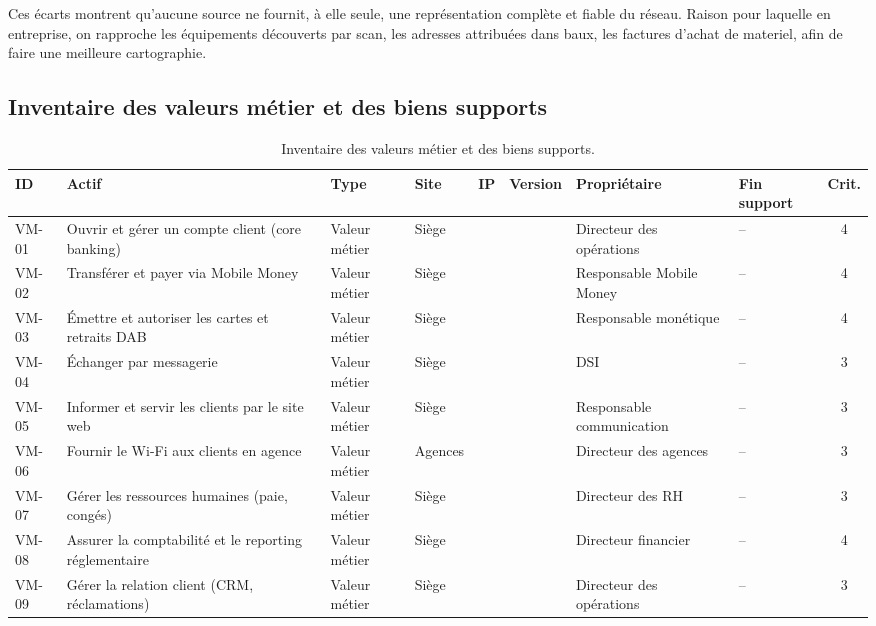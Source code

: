 \documentclass[11pt,a4paper]{article}
\newcommand{\NA}{\textemdash}
\begin{document}
	Ces écarts montrent qu'aucune source ne fournit, à elle seule, une représentation complète et fiable du réseau. Raison pour laquelle en entreprise, on rapproche les équipements découverts par scan, les adresses attribuées  dans baux, les factures d'achat de materiel, afin de faire une meilleure cartographie.
	
	\subsection{Inventaire des valeurs métier et des biens supports}
	
	\scriptsize
	\begin{longtable}{p{0.8cm} p{2.5cm} p{1.3cm} p{1.2cm} p{1.7cm} p{1.5cm} p{2.1cm} p{1.2cm} c}
		\caption{Inventaire des valeurs métier et des biens supports.}\\
		\hline
		\textbf{ID} & \textbf{Actif} & \textbf{Type} & \textbf{Site} & \textbf{IP} & \textbf{Version} & \textbf{Propriétaire} & \textbf{Fin support} & \textbf{Crit.}\\
		\hline
		\endhead
		VM-01 & Ouvrir et gérer un compte client (core banking) & Valeur métier & Siège & \NA & \NA & Directeur des opérations & -- & 4\\
		\hline
		VM-02 & Transférer et payer via Mobile Money & Valeur métier & Siège & \NA & \NA & Responsable Mobile Money & -- & 4\\
		\hline
		VM-03 & Émettre et autoriser les cartes et retraits DAB & Valeur métier & Siège & \NA & \NA & Responsable monétique & -- & 4\\
		\hline
		VM-04 & Échanger par messagerie & Valeur métier & Siège & \NA & \NA & DSI & -- & 3\\
		\hline
		VM-05 & Informer et servir les clients par le site web & Valeur métier & Siège & \NA & \NA & Responsable communication & -- & 3\\
		\hline
		VM-06 & Fournir le Wi-Fi aux clients en agence & Valeur métier & Agences & \NA & \NA & Directeur des agences & -- & 3\\
		\hline
		VM-07 & Gérer les ressources humaines (paie, congés) & Valeur métier & Siège & \NA & \NA & Directeur des RH & -- & 3\\
		\hline
		VM-08 & Assurer la comptabilité et le reporting réglementaire & Valeur métier & Siège & \NA & \NA & Directeur financier & -- & 4\\
		\hline
		VM-09 & Gérer la relation client (CRM, réclamations) & Valeur métier & Siège & \NA & \NA & Directeur des opérations & -- & 3\\

\end{longtable}
\end{document}
